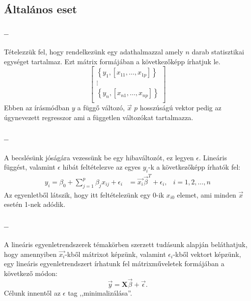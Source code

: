 \documentclass [aspectratio=169]{beamer}
\newcommand{\titten}{\secname{} -- \subsecname}
\begin{document}
\subsection{Általános eset}
\begin{frame}
\frametitle{\titten}
Tételezzük fel, hogy rendelkezünk egy adathalmazzal amely $n$ darab statisztikai egységet tartalmaz. Ezt mátrix formájában a következőképp írhatjuk le.
\begin{equation*}
\left[
\begin{matrix}
\left\lbrace y_1,[x_{11},\dots,x_{1p}]\right\rbrace\\
\vdots\\
\left\lbrace y_n,[x_{n1},\dots,x_{np}]\right\rbrace\\
\end{matrix}
\right]
\end{equation*}
Ebben az írásmódban $y$ a függő változó, $\vec{x}$ $p$ hosszúságú vektor pedig az úgynevezett regresszor ami a független változókat tartalmazza.
\end{frame}
\begin{frame}
\frametitle{\titten}
A becslésünk jóságára vezessünk be egy hibaváltozót, ez legyen $\epsilon$. Lineáris függést, valamint $\epsilon$ hibát feltételezve az egyes $y_i$-k a következőképp írhatók fel:
\begin{align*}
y_i=\beta_0+\sum_{j=1}^{p}\beta_jx_{ij}+\epsilon_i&=\vec{x_i}\vec{\beta}^T+\epsilon_i, & i=1,2,\dots,n
\end{align*}
Az egyenletből látszik, hogy itt feltételezünk egy 0-ik $x_{i0}$ elemet, ami minden $\vec{x}$ esetén 1-nek adódik.
\end{frame}
\begin{frame}
\frametitle{\titten}
A lineáris egyenletrendszerek témakörben szerzett tudásunk alapján beláthatjuk, hogy amennyiben $\vec{x_i}$-kből mátrixot képzünk, valamint $\epsilon_i$-kből vektort képzünk, egy lineáris egyenletrendszert írhatunk fel mátrixműveletek formájában a következő módon:
\begin{equation*}
\vec{y}=\mathbf{X}\vec{\beta}+\vec{\epsilon}.
\end{equation*}
Célunk innentől az $\epsilon$ tag ,,minimalizálása''.
\end{frame}
\end{document}
